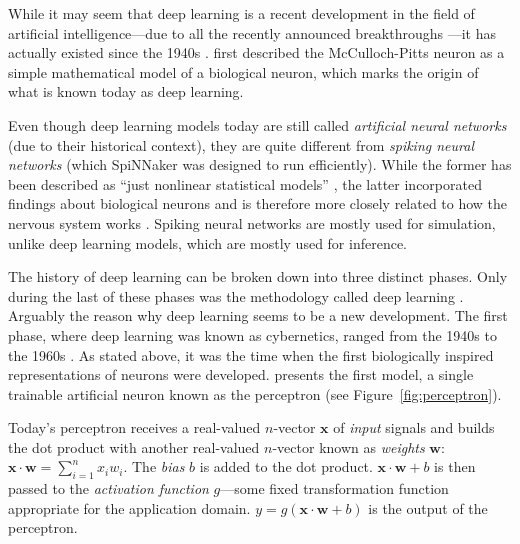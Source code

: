 \documentclass[]{article}
\begin{document}
While it may seem that deep learning is a recent development in the
field of artificial intelligence---due to all the recently announced
breakthroughs \citep{senior_et_al_2020, vinyals_et_al_2019,
  openai_2019, margi_2019}---it has actually existed since the 1940s
\citep{goodfellow_et_al_2016}.
\citet{mcculloch_et_al_1943} first described the McCulloch-Pitts
neuron as a simple mathematical model of a biological neuron, which
marks the origin of what is known today as deep learning.

Even though deep learning models today are still called
\textit{artificial neural networks} (due to their historical context),
they are quite different from \textit{spiking neural networks}
(which SpiNNaker was designed to run efficiently).
While the former has been described as ``just nonlinear statistical
models'' \citep{hastie_et_al_2009}, the latter incorporated findings
about biological neurons and is therefore more closely related to how
the nervous system works \citep{maass1997}.
Spiking neural networks are mostly used for simulation, unlike deep
learning models, which are mostly used for inference.

The history of deep learning can be broken down into three distinct
phases.
Only during the last of these phases was the methodology
called deep learning \citep{goodfellow_et_al_2016}.
Arguably the reason why deep learning seems to be a new development.
The first phase, where deep learning was known as cybernetics, ranged
from the 1940s to the 1960s \citep{goodfellow_et_al_2016}.
As stated above, it was the time when the first biologically
inspired representations of neurons were developed.
\citet{rosenblatt_1958} presents the first model, a single trainable
artificial neuron known as the perceptron (see
Figure~\ref{fig:perceptron}).

Today's perceptron receives a real-valued $n$-vector $\mathbf{x}$ of
\textit{input} signals and builds the dot product with another
real-valued $n$-vector known as \textit{weights} $\mathbf{w}$:
$\mathbf{x}\cdot\mathbf{w} = \sum_{i=1}^{n}x_iw_i$.
The \textit{bias} $b$ is added to the dot product.
$\mathbf{x} \cdot \mathbf{w} + b$ is then passed to the
\textit{activation function} $g$---some fixed transformation function
appropriate for the application domain.
$y = g(\mathbf{x} \cdot \mathbf{w} + b)$ is the output of the
perceptron.
\end{document}
